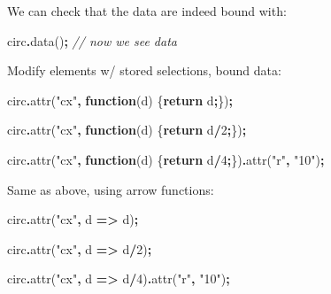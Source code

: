 \documentclass[
  openany]{book}
\newenvironment{Shaded}{\begin{snugshade}}{\end{snugshade}}
\newcommand{\CommentTok}[1]{\textcolor[rgb]{0.56,0.35,0.01}{\textit{#1}}}
\newcommand{\ControlFlowTok}[1]{\textcolor[rgb]{0.13,0.29,0.53}{\textbf{#1}}}
\newcommand{\DecValTok}[1]{\textcolor[rgb]{0.00,0.00,0.81}{#1}}
\newcommand{\FunctionTok}[1]{\textcolor[rgb]{0.00,0.00,0.00}{#1}}
\newcommand{\KeywordTok}[1]{\textcolor[rgb]{0.13,0.29,0.53}{\textbf{#1}}}
\newcommand{\NormalTok}[1]{#1}
\newcommand{\OperatorTok}[1]{\textcolor[rgb]{0.81,0.36,0.00}{\textbf{#1}}}
\newcommand{\StringTok}[1]{\textcolor[rgb]{0.31,0.60,0.02}{#1}}
\begin{document}
We can check that the data are indeed bound with:

\begin{Shaded}
\begin{Highlighting}[]
\NormalTok{circ}\OperatorTok{.}\FunctionTok{data}\NormalTok{()}\OperatorTok{;}  \CommentTok{// now we see data}
\end{Highlighting}
\end{Shaded}

Modify elements w/ stored selections, bound data:

\begin{Shaded}
\begin{Highlighting}[]
\NormalTok{circ}\OperatorTok{.}\FunctionTok{attr}\NormalTok{(}\StringTok{"cx"}\OperatorTok{,} \KeywordTok{function}\NormalTok{(d) \{}\ControlFlowTok{return}\NormalTok{ d}\OperatorTok{;}\NormalTok{\})}\OperatorTok{;}

\NormalTok{circ}\OperatorTok{.}\FunctionTok{attr}\NormalTok{(}\StringTok{"cx"}\OperatorTok{,} \KeywordTok{function}\NormalTok{(d) \{}\ControlFlowTok{return}\NormalTok{ d}\OperatorTok{/}\DecValTok{2}\OperatorTok{;}\NormalTok{\})}\OperatorTok{;}

\NormalTok{circ}\OperatorTok{.}\FunctionTok{attr}\NormalTok{(}\StringTok{"cx"}\OperatorTok{,} \KeywordTok{function}\NormalTok{(d) \{}\ControlFlowTok{return}\NormalTok{ d}\OperatorTok{/}\DecValTok{4}\OperatorTok{;}\NormalTok{\})}\OperatorTok{.}\FunctionTok{attr}\NormalTok{(}\StringTok{"r"}\OperatorTok{,} \StringTok{"10"}\NormalTok{)}\OperatorTok{;}
\end{Highlighting}
\end{Shaded}

Same as above, using arrow functions:

\begin{Shaded}
\begin{Highlighting}[]
\NormalTok{circ}\OperatorTok{.}\FunctionTok{attr}\NormalTok{(}\StringTok{"cx"}\OperatorTok{,}\NormalTok{ d }\KeywordTok{=\textgreater{}}\NormalTok{ d)}\OperatorTok{;}

\NormalTok{circ}\OperatorTok{.}\FunctionTok{attr}\NormalTok{(}\StringTok{"cx"}\OperatorTok{,}\NormalTok{ d }\KeywordTok{=\textgreater{}}\NormalTok{ d}\OperatorTok{/}\DecValTok{2}\NormalTok{)}\OperatorTok{;}

\NormalTok{circ}\OperatorTok{.}\FunctionTok{attr}\NormalTok{(}\StringTok{"cx"}\OperatorTok{,}\NormalTok{ d }\KeywordTok{=\textgreater{}}\NormalTok{ d}\OperatorTok{/}\DecValTok{4}\NormalTok{)}\OperatorTok{.}\FunctionTok{attr}\NormalTok{(}\StringTok{"r"}\OperatorTok{,} \StringTok{"10"}\NormalTok{)}\OperatorTok{;}
\end{Highlighting}
\end{Shaded}
\end{document}
